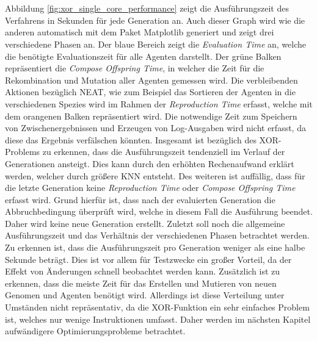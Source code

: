 \\\\
Abbildung \ref{fig:xor_single_core_performance} zeigt die Ausführungszeit des Verfahrens in Sekunden für jede Generation an. Auch dieser Graph wird wie die anderen automatisch mit dem Paket Matplotlib generiert und zeigt drei verschiedene Phasen an. Der blaue Bereich zeigt die \emph{Evaluation Time } an, welche die benötigte Evaluationszeit für alle Agenten darstellt. Der grüne Balken repräsentiert die \emph{Compose Offspring Time}, in welcher die Zeit für die Rekombination und Mutation aller Agenten gemessen wird. Die verbleibenden Aktionen bezüglich \ac{NEAT}, wie zum Beispiel das Sortieren der Agenten in die verschiedenen Spezies wird im Rahmen der \emph{Reproduction Time} erfasst, welche mit dem orangenen Balken repräsentiert wird. Die notwendige Zeit zum Speichern von Zwischenergebnissen und Erzeugen von Log-Ausgaben wird nicht erfasst, da diese das Ergebnis verfälschen könnten. Insgesamt ist bezüglich des XOR-Problems zu erkennen, dass die Ausführungszeit tendenziell im Verlauf der Generationen ansteigt. Dies kann durch den erhöhten Rechenaufwand erklärt werden, welcher durch größere \ac{KNN} entsteht. Des weiteren ist auffällig, dass für die letzte Generation keine \emph{Reproduction Time} oder \emph{Compose Offspring Time} erfasst wird. Grund hierfür ist, dass nach der evaluierten Generation die Abbruchbedingung überprüft wird, welche in diesem Fall die Ausführung beendet. Daher wird  keine neue Generation erstellt. Zuletzt soll noch die allgemeine Ausführungszeit und das Verhältnis der verschiedenen Phasen betrachtet werden. Zu erkennen ist, dass die Ausführungszeit pro Generation weniger als eine halbe Sekunde beträgt. Dies ist vor allem für Testzwecke ein großer Vorteil, da der Effekt von Änderungen schnell beobachtet werden kann. Zusätzlich ist zu erkennen, dass die meiste Zeit für das Erstellen und Mutieren von neuen Genomen und Agenten benötigt wird. Allerdings ist diese Verteilung unter Umständen nicht repräsentativ, da die XOR-Funktion ein sehr einfaches Problem ist, welches nur wenige Instruktionen umfasst. Daher werden im nächsten Kapitel aufwändigere Optimierungsprobleme betrachtet.
